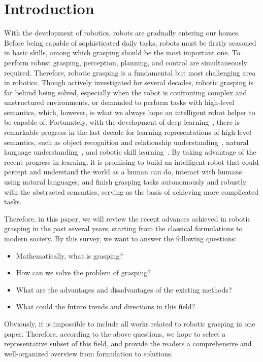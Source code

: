 \documentclass[letterpaper,10pt]{article}
\begin{document}
\section{Introduction}

With the development of robotics, robots are gradually entering our homes. Before being capable of sophisticated daily tasks, robots must be firstly seasoned in basic skills, among which grasping should be the most important one. To perform robust grasping, perception, planning, and control are simultaneously required. Therefore, robotic grasping is a fundamental but most challenging area in robotics.
Though actively investigated for several decades, robotic grasping is far behind being solved, especially when the robot is confronting complex and unstructured environments, or demanded to perform tasks with high-level semantics, which, however, is what we always hope an intelligent robot helper to be capable of.
Fortunately, with the development of deep learning~\cite{lecun2015deep}, there is remarkable progress in the last decade for learning representations of high-level semantics, such as object recognition and relationship understanding~\cite{liu2020deep}, natural language understanding~\cite{otter2020survey}, and robotic skill learning~\cite{kroemer2021review}.
By taking advantage of the recent progress in learning, it is promising to build an intelligent robot that could percept and understand the world as a human can do, interact with humans using natural languages, and finish grasping tasks autonomously and robustly with the abstracted semantics, serving as the basis of achieving more complicated tasks.

Therefore, in this paper, we will review the recent advances achieved in robotic grasping in the past several years, starting from the classical formulations to modern society.
By this survey, we want to answer the following questions:
\begin{itemize}
	\item Mathematically, what is grasping?
	\item How can we solve the problem of grasping?
	\item What are the advantages and disadvantages of the existing methods?
	\item What could the future trends and directions in this field?
\end{itemize}
Obviously, it is impossible to include all works related to robotic grasping in one paper. Therefore, according to the above questions, we hope to select a representative subset of this field, and provide the readers a comprehensive and well-organized overview from formulation to solutions.
\end{document}
